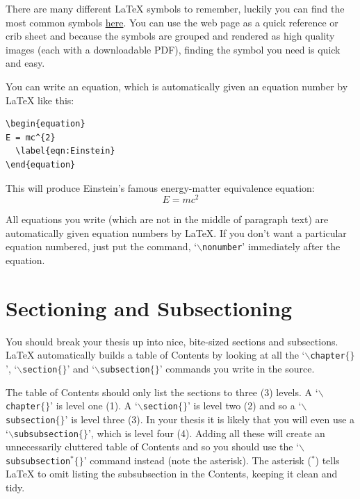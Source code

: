 There are many different \LaTeX{} symbols to remember, luckily you can find the most common symbols \href{http://www.sunilpatel.co.uk/latexsymbols.html}{here}. You can use the web page as a quick reference or crib sheet and because the symbols are grouped and rendered as high quality images (each with a downloadable PDF), finding the symbol you need is quick and easy.

You can write an equation, which is automatically given an equation number by \LaTeX{} like this:
\begin{verbatim}
\begin{equation}
E = mc^{2}
  \label{eqn:Einstein}
\end{equation}
\end{verbatim}

This will produce Einstein's famous energy-matter equivalence equation:
\begin{equation}
E = mc^{2}
\label{eqn:Einstein}
\end{equation}

All equations you write (which are not in the middle of paragraph text) are automatically given equation numbers by \LaTeX{}. If you don't want a particular equation numbered, just put the command, `$\backslash$\texttt{nonumber}' immediately after the equation.


\section{Sectioning and Subsectioning}

You should break your thesis up into nice, bite-sized sections and subsections. \LaTeX{} automatically builds a table of Contents by looking at all the `$\backslash$\texttt{chapter}$\{\}$', `$\backslash$\texttt{section}$\{\}$' and `$\backslash$\texttt{subsection}$\{\}$' commands you write in the source.

The table of Contents should only list the sections to three (3) levels. A `$\backslash$\texttt{chapter}$\{\}$' is level one (1). A `$\backslash$\texttt{section}$\{\}$' is level two (2) and so a `$\backslash$\texttt{subsection}$\{\}$' is level three (3). In your thesis it is likely that you will even use a `$\backslash$\texttt{subsubsection}$\{\}$', which is level four (4). Adding all these will create an unnecessarily cluttered table of Contents and so you should use the `$\backslash$\texttt{subsubsection$^{*}\{\}$}' command instead (note the asterisk). The asterisk ($^{*}$) tells \LaTeX{} to omit listing the subsubsection in the Contents, keeping it clean and tidy.
